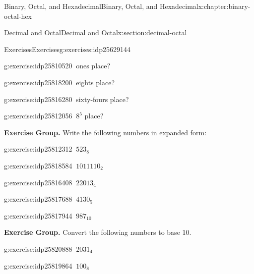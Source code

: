 \documentclass[twoside,10pt,]{book}
\numberwithin{equation}{section}
\begin{document}
\begin{chapterptx}{Binary, Octal, and Hexadecimal}{}{Binary, Octal, and Hexadecimal}{}{}{x:chapter:binary-octal-hex}
\begin{sectionptx}{Decimal and Octal}{}{Decimal and Octal}{}{}{x:section:decimal-octal}
\begin{exercises-subsection}{Exercises}{}{Exercises}{}{}{g:exercises:idp25629144}
\begin{exercisegroup}
\begin{divisionexerciseeg}{8}{}{}{g:exercise:idp25810520}%
\(\ \)ones place?\end{divisionexerciseeg}%
\begin{divisionexerciseeg}{9}{}{}{g:exercise:idp25818200}%
\(\ \)eights place?\end{divisionexerciseeg}%
\begin{divisionexerciseeg}{10}{}{}{g:exercise:idp25816280}%
\(\ \)sixty-fours place?\end{divisionexerciseeg}%
\begin{divisionexerciseeg}{11}{}{}{g:exercise:idp25812056}%
\(\ 8^5\) place?\end{divisionexerciseeg}%
\end{exercisegroup}
\par\medskip\noindent
\par\medskip\noindent%
\textbf{Exercise Group.}\space\space%
Write the following numbers in expanded form:%
\begin{exercisegroup}
\begin{divisionexerciseeg}{12}{}{}{g:exercise:idp25812312}%
\(\ 523_8\)\end{divisionexerciseeg}%
\begin{divisionexerciseeg}{13}{}{}{g:exercise:idp25818584}%
\(\ 1011110_2\)\end{divisionexerciseeg}%
\begin{divisionexerciseeg}{14}{}{}{g:exercise:idp25816408}%
\(\ 22013_4\)\end{divisionexerciseeg}%
\begin{divisionexerciseeg}{15}{}{}{g:exercise:idp25817688}%
\(\ 4130_5\)\end{divisionexerciseeg}%
\begin{divisionexerciseeg}{16}{}{}{g:exercise:idp25817944}%
\(\ 987_{10}\)\end{divisionexerciseeg}%
\end{exercisegroup}
\par\medskip\noindent
\par\medskip\noindent%
\textbf{Exercise Group.}\space\space%
Convert the following numbers to base 10.%
\begin{exercisegroup}
\begin{divisionexerciseeg}{17}{}{}{g:exercise:idp25820888}%
\(\ 2031_4\)\end{divisionexerciseeg}%
\begin{divisionexerciseeg}{19}{}{}{g:exercise:idp25819864}%
\(\ 100_8\)\end{divisionexerciseeg}%

\end{exercisegroup}
\end{exercises-subsection}
\end{sectionptx}
\end{chapterptx}
\end{document}
